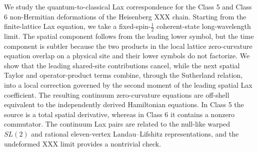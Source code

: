 We study the quantum-to-classical Lax correspondence for the Class 5 and
Class 6 non-Hermitian deformations of the Heisenberg XXX chain.  Starting from
the finite-lattice Lax equation, we take a fixed-spin-$\tfrac12$
coherent-state long-wavelength limit.  The spatial component follows from the
leading lower symbol, but the time component is subtler because the two
products in the local lattice zero-curvature equation overlap on a physical
site and their lower symbols do not factorize.  We show that the leading
shared-site contributions cancel, while the next spatial Taylor and
operator-product terms combine, through the Sutherland relation, into a local
correction governed by the second moment of the leading spatial Lax
coefficient.  The resulting continuum zero-curvature equations are off-shell
equivalent to the independently derived Hamiltonian equations.  In Class 5
the source is a total spatial derivative, whereas in Class 6 it contains a
nonzero commutator.  The continuum Lax pairs are related to the null-like
warped $SL(2)$ and rational eleven-vertex Landau--Lifshitz representations,
and the undeformed XXX limit provides a nontrivial check.
